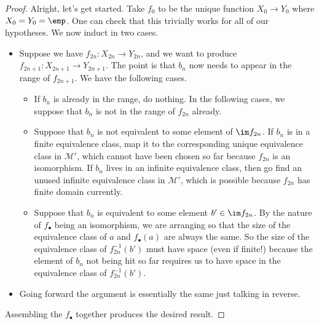 \documentclass[../notes.tex]{subfiles}
\begin{document}
\begin{proof}
	Alright, let's get started. Take $f_0$ to be the unique function $X_0\to Y_0$ where $X_0=Y_0=\emp$. One can check that this trivially works for all of our hypotheses. We now induct in two cases.
	\begin{itemize}
		\item Suppose we have $f_{2n}\colon X_{2n}\to Y_{2n}$, and we want to produce $f_{2n+1}\colon X_{2n+1}\to Y_{2n+1}$. The point is that $b_n$ now needs to appear in the range of $f_{2n+1}$. We have the following cases.
		\begin{itemize}
			\item If $b_n$ is already in the range, do nothing. In the following cases, we suppose that $b_n$ is not in the range of $f_{2n}$ already.
			\item Suppose that $b_n$ is not equivalent to some element of $\im f_{2n}$. If $b_n$ is in a finite equivalence class, map it to the corresponding unique equivalence class in $\mathcal M'$, which cannot have been chosen so far because $f_{2n}$ is an isomorphism. If $b_n$ lives in an infinite equivalence class, then go find an unused infinite equivalence class in $\mathcal M'$, which is possible because $f_{2n}$ has finite domain currently.
			\item Suppose that $b_n$ is equivalent to some element $b'\in\im f_{2n}$. By the nature of $f_\bullet$ being an isomorphism, we are arranging so that the size of the equivalence class of $a$ and $f_\bullet(a)$ are always the same. So the size of the equivalence class of $f^{-1}_{2n}(b')$ must have space (even if finite!) because the element of $b_n$ not being hit so far requires us to have space in the equivalence class of $f^{-1}_{2n}(b')$.
		\end{itemize}


		\item Going forward the argument is essentially the same just talking in reverse.
	\end{itemize}
	Assembling the $f_\bullet$ together produces the desired result.
\end{proof}
\end{document}
